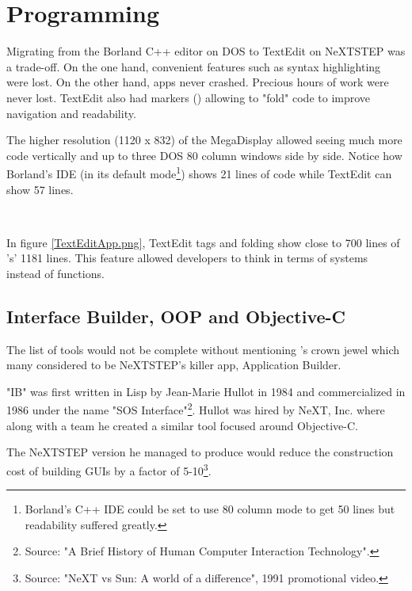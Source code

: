 \vspace{-10pt}
\section{Programming}
Migrating from the Borland C++ editor on DOS to TextEdit on NeXTSTEP was a trade-off. On the one hand, convenient features such as syntax highlighting were lost. On the other hand, apps never crashed. Precious hours of work were never lost. TextEdit also had markers (\cw{//}) allowing to "fold" code to improve navigation and readability.\\
\par
 The higher resolution (1120 x 832) of the MegaDisplay allowed seeing much more code vertically and up to three DOS 80 column windows side by side. Notice how Borland's IDE (in its default mode\footnote{Borland's C++ IDE could be set to use 80 column mode to get 50 lines but readability suffered greatly.}) shows 21 lines of code while TextEdit can show 57 lines.\\
\par
{}\\

\vspace{-4mm}


In figure \ref{TextEditApp.png}, TextEdit tags and folding show close to 700 lines of 's' 1181 lines. This feature allowed developers to think in terms of systems instead of functions.

\subsection{Interface Builder, OOP and Objective-C}
The list of tools would not be complete without mentioning \NeXTns{}'s crown jewel which many considered to be NeXTSTEP's killer app, Application Builder.\\
\par
"IB" was first written in Lisp by Jean-Marie Hullot in 1984 and commercialized in 1986 under the name "SOS Interface"\footnote{Source: "A Brief History of Human Computer Interaction Technology".}. Hullot was hired by NeXT, Inc. where along with a team he created a similar tool focused around Objective-C.\\
\par
The NeXTSTEP version he managed to produce would reduce the construction cost of building GUIs by a factor of 5-10\footnote{Source: "NeXT vs Sun: A world of a difference", 1991 promotional video.}.\\
\par
{}



